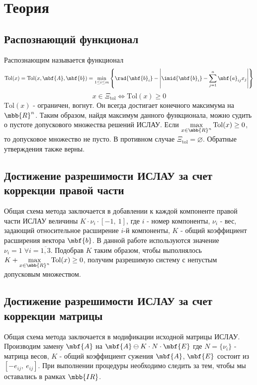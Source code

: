 \documentclass[a4paper]{article}
\begin{document}
\section{Теория}
\subsection{Распознающий функционал}
Распознающим называется функционал 
\begin{equation*}
    \mathrm{Tol}(x)=\mathrm{Tol}(x,\mbf{A},\mbf{b})=\min_{1\leq i\leq m}\left\{\rad{\mbf{b}_i}-\left|\imid{\mbf{b}_i}-\sum_{j=1}^n \mbf{a}_{ij}x_j\right|\right\}
\end{equation*}
\begin{equation*}
    x\in\Xi_{\mathrm{tol}}\Leftrightarrow\mathrm{Tol}(x)\geq0
\end{equation*}
$\mathrm{Tol}(x)$ - ограничен, вогнут. Он всегда достигает конечного максимума на $\mbb{R}^n$. Таким образом, найдя максимум данного функционала, можно судить о пустоте допускового множества решений ИСЛАУ. Если $\max\limits_{x\in\mbb{R}^n}\mathrm{Tol}(x)\geq0$, то допусковое множество не пусто. В противном случае $\Xi_{\mathrm{tol}}=\varnothing$. Обратные утверждения также верны.
\subsection{Достижение разрешимости ИСЛАУ за счет коррекции правой части}
Общая схема метода заключается в добавлении к каждой компоненте правой части ИСЛАУ величины $K\cdot\nu_i\cdot[-1,\:1]$, где $i$ - номер компоненты, $\nu_i$ - вес, задающий относительное расширение $i$-й компоненты, $K$ - общий коэффициент расширения вектора $\mbf{b}$. В данной работе используются значение $\nu_i=1\;\forall i=\overline{1,3}$. Подобрав $K$ таким образом, чтобы выполнялось $ K +\max\limits_{x\in\mbb{R}^n}\mathrm{Tol}(x)\geq0$, получим разрешимую систему с непустым допусковым множеством.
\subsection{Достижение разрешимости ИСЛАУ за счет коррекции матрицы}
Общая схема метода заключается в модификации исходной матрицы ИСЛАУ. Производим замену $\mbf{A}$ на $\mbf{A}\ominus K\cdot N\cdot\mbf{E}$ где $ N=\{\nu_i\}$ - матрица весов, $K$ - общий коэффициент сужения $\mbf{A}$, $\mbf{E}$ состоит из $[-e_{ij},\:e_{ij}]$. При выполнении процедуры необходимо следить за тем, чтобы мы оставались в рамках $\mbb{IR}$. 
\end{document}
